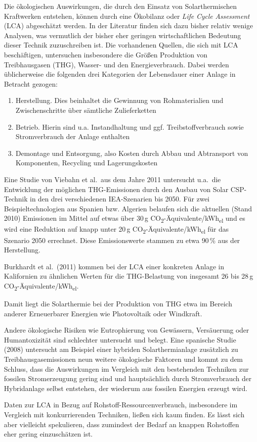 Die ökologischen Auswirkungen, die durch den Einsatz von Solarthermischen Kraftwerken entstehen, können durch eine Ökobilanz oder \emph{Life Cycle Assessment} (LCA) abgeschätzt werden.
In der Literatur finden sich dazu bisher relativ wenige Analysen, was vermutlich der bisher eher geringen wirtschaftlichen Bedeutung dieser Technik zuzuschreiben ist. Die vorhandenen Quellen, die sich mit LCA beschäftigen, untersuchen insbesondere die Größen Produktion von Treibhausgasen (THG), Wasser- und den Energieverbrauch.
Dabei werden üblicherweise die folgenden drei Kategorien der Lebensdauer einer Anlage in Betracht gezogen:
\begin{enumerate}
\item Herstellung. Dies beinhaltet die Gewinnung von Rohmaterialien und Zwischenschritte über sämtliche Zulieferketten
\item Betrieb. Hierin sind u.a. Instandhaltung und ggf. Treibstoffverbrauch sowie Stromverbrauch der Anlage enthalten
\item Demontage und Entsorgung, also Kosten durch Abbau und Abtransport von Komponenten, Recycling und Lagerungskosten
\end{enumerate}

Eine Studie\cite{viebahn2011} von Viebahn et al.\ aus dem Jahre 2011 untersucht u.a.\ die Entwicklung der möglichen THG-Emissionen durch den Ausbau von Solar CSP-Technik in den drei verschiedenen IEA-Szenarien\cite{iea2010} bis 2050.
Für zwei Beispieltechnologien aus Spanien bzw. Algerien belaufen sich die aktuellen (Stand 2010) Emissionen im Mittel auf etwas über 30\,g CO\textsubscript{2}-Äquivalente/kWh\textsubscript{el} und es wird eine Reduktion auf knapp unter 20\,g CO\textsubscript{2}-Äquivalente/kWh\textsubscript{el} für das Szenario 2050 errechnet.
Diese Emissionswerte stammen zu etwa 90\,\% aus der Herstellung.

Burkhardt et al.\ (2011)\cite{burkhardt2011} kommen bei der LCA einer konkreten Anlage in Kalifornien zu ähnlichen Werten für die THG-Belastung von insgesamt 26 bis 28\,g CO\textsubscript{2}-Äquivalente/kWh\textsubscript{el}.

Damit liegt die Solarthermie bei der Produktion von THG etwa im Bereich anderer Erneuerbarer Energien wie Photovoltaik oder Windkraft.\cite{viebahn2011}

Andere ökologische Risiken wie Eutrophierung von Gewässern, Versäuerung oder Humantoxizität sind schlechter untersucht und belegt. Eine spanische Studie\nocite{lechon2008} (2008) untersucht am Beispiel einer hybriden Solarthermianlage zusätzlich zu Treibhausgasemissionen neun weitere ökologische Faktoren und kommt zu dem Schluss, dass die Auswirkungen im Vergleich mit den bestehenden Techniken zur fossilen Stromerzeugung gering sind und hauptsächlich durch Stromverbrauch der Hybridanlage selbst entstehen, der wiederum aus fossilen Energien erzeugt wird.

Daten zur LCA in Bezug auf Rohstoff-Ressourcenverbrauch, insbesondere im Vergleich mit konkurrierenden Techniken, ließen sich kaum finden. Es lässt sich aber vielleicht spekulieren, dass zumindest der Bedarf an knappen Rohstoffen eher gering einzuschätzen ist.
